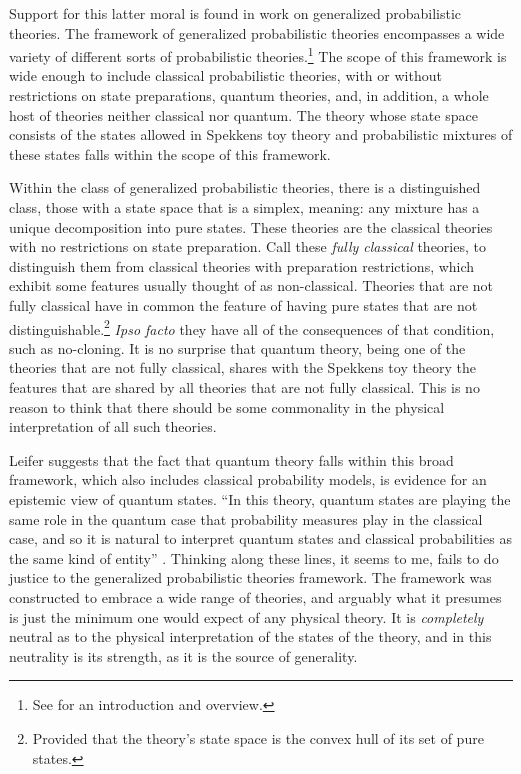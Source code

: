\documentclass[12pt]{article}
\begin{document}
Support for this latter moral is found in  work on generalized probabilistic theories.  The  framework of generalized probabilistic theories encompasses a wide variety of different sorts of probabilistic theories.\footnote{See \citet{JH2014} for an introduction and overview.} The scope of this framework is wide enough to include classical probabilistic theories, with or without restrictions on state preparations, quantum theories, and, in addition, a whole host of theories neither classical nor quantum.  The theory whose state space consists of the states allowed in Spekkens toy theory and probabilistic mixtures of these states falls within the scope of this framework.

Within the class of generalized probabilistic theories, there is a distinguished class, those with a  state space that  is a  simplex, meaning: any mixture has a unique decomposition into pure states. These theories are the classical theories with no restrictions on state preparation.  Call these \emph{fully classical} theories, to distinguish them from classical theories with preparation restrictions, which exhibit some features usually thought of as non-classical.   Theories that are not fully classical  have in common the feature of having pure states that are not distinguishable.\footnote{Provided that  the theory's state space is the convex hull of its set of pure states.}  \emph{Ipso facto} they have all of the consequences of that condition, such as no-cloning.  It is no surprise that quantum theory, being one of the theories that are not fully classical, shares with the Spekkens toy theory the features that are shared by all theories that are not fully classical.  This is no reason to think that there should be some commonality in the physical interpretation of all such theories.

Leifer suggests that the fact that quantum theory falls within this broad framework, which also includes classical probability models, is evidence for an epistemic view of quantum states.  ``In this theory, quantum states are playing the same role in the quantum case that probability measures play in the classical case, and so it is natural to interpret quantum states and classical probabilities as the same kind of entity'' \citep[p. 76]{LeiferPsiOnt}.  Thinking along these lines, it  seems to me, fails to do justice to the generalized probabilistic theories framework. The framework was constructed to embrace a wide range of theories, and arguably what it presumes is just the minimum one would expect of any physical theory.  It is \emph{completely} neutral as to the physical interpretation of the states of the theory, and in this neutrality is its strength, as it is the source of  generality.
\end{document}
